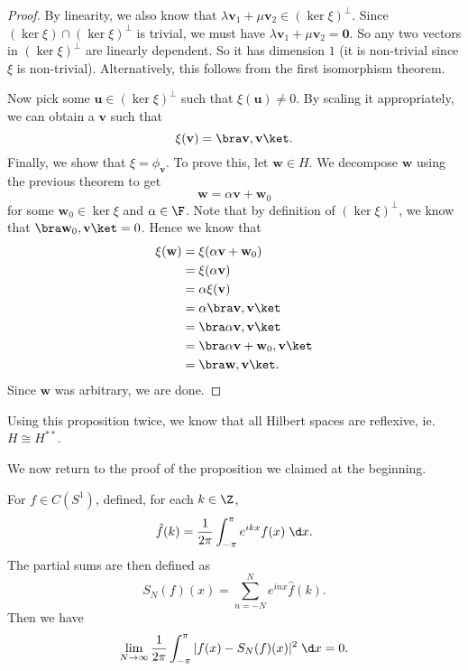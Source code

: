 \documentclass[a4paper]{article}
\begin{document}
\begin{proof}
  By linearity, we also know that $\lambda \mathbf{v}_1 + \mu \mathbf{v}_2 \in (\ker \xi)^\perp$. Since $(\ker \xi) \cap (\ker \xi)^\perp$ is trivial, we must have $\lambda \mathbf{v}_1 + \mu \mathbf{v}_2 = \mathbf{0}$. So any two vectors in $(\ker \xi)^\perp$ are linearly dependent. So it has dimension $1$ (it is non-trivial since $\xi$ is non-trivial). Alternatively, this follows from the first isomorphism theorem.

  Now pick some $\mathbf{u} \in (\ker \xi)^\perp$ such that $\xi(\mathbf{u}) \not= 0$. By scaling it appropriately, we can obtain a $\mathbf{v}$ such that
  \[
    \xi(\mathbf{v}) = \bra \mathbf{v}, \mathbf{v}\ket.
  \]
  Finally, we show that $\xi = \phi_\mathbf{v}$. To prove this, let $\mathbf{w} \in H$. We decompose $\mathbf{w}$ using the previous theorem to get
  \[
    \mathbf{w} = \alpha \mathbf{v} + \mathbf{w}_0
  \]
  for some $\mathbf{w}_0 \in \ker \xi$ and $\alpha \in \F$. Note that by definition of $(\ker \xi)^\perp$, we know that $\bra \mathbf{w}_0, \mathbf{v}\ket = 0$. Hence we know that
  \begin{align*}
    \xi(\mathbf{w}) &= \xi(\alpha \mathbf{v} + \mathbf{w}_0)\\
    &= \xi(\alpha \mathbf{v})\\
    &= \alpha \xi (\mathbf{v})\\
    &= \alpha \bra \mathbf{v}, \mathbf{v}\ket\\
    &= \bra \alpha \mathbf{v}, \mathbf{v}\ket\\
    &= \bra \alpha \mathbf{v} + \mathbf{w}_0, \mathbf{v}\ket\\
    &= \bra \mathbf{w}, \mathbf{v}\ket.
  \end{align*}
  Since $\mathbf{w}$ was arbitrary, we are done.
\end{proof}

Using this proposition twice, we know that all Hilbert spaces are reflexive, ie. $H \cong H^{**}$.

We now return to the proof of the proposition we claimed at the beginning.
\begin{prop}
  For $f \in C(S^1)$, defined, for each $k \in \Z$,
  \[
    \hat{f}(k) = \frac{1}{2\pi} \int_{-\pi}^\pi e^{ikx}f(x)\;\d x.
  \]
  The partial sums are then defined as
  \[
    S_N(f)(x) = \sum_{n = -N}^N e^{inx} \hat{f}(k).
  \]
  Then we have
  \[
    \lim_{N \to \infty} \frac{1}{2\pi}\int_{-\pi}^\pi |f(x) - S_N(f)(x)|^2 \;\d x = 0.
  \]
\end{prop}
\end{document}
